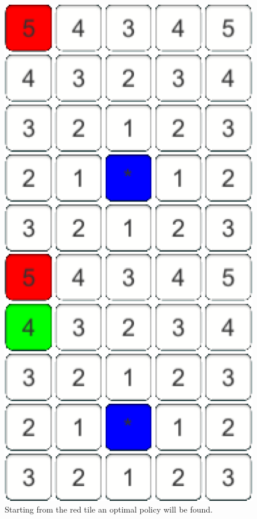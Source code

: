 \documentclass[conference]{IEEEtran}
\begin{document}
\begin{figure}[h]
\centering
\begin{minipage}[t]{0.3\linewidth}
\centering
\includegraphics[width=1\textwidth]{images/FindingPolicy/01.png}
\caption{Starting from the red tile an optimal policy will be found.}
\end{minipage}
\hfill
\begin{minipage}[t]{0.3\linewidth}
\centering
\includegraphics[width=1\textwidth]{images/FindingPolicy/02.png}

\end{minipage}
\end{figure}
\end{document}
